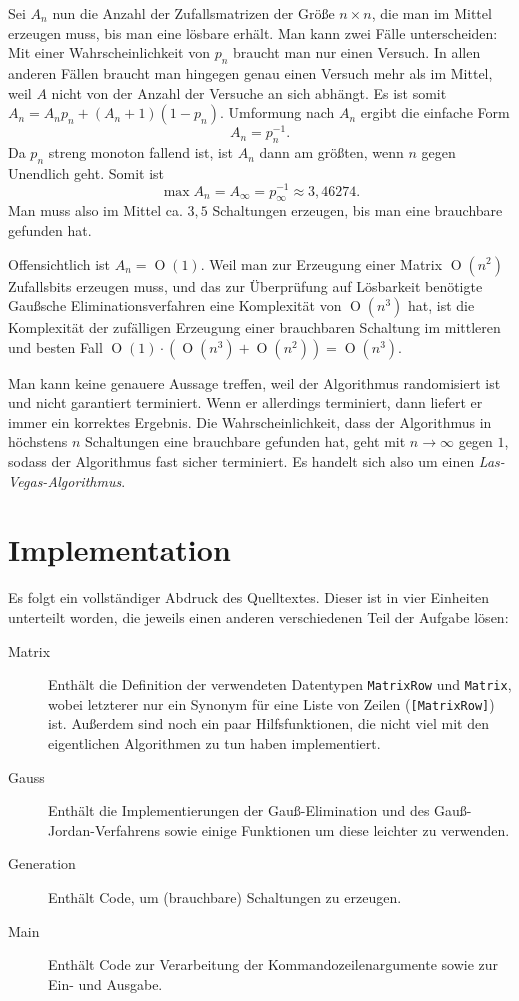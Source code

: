 \documentclass{scrartcl}
\DeclareMathOperator{\bigO}{O}
\begin{document}
Sei $A_n$ nun die Anzahl der Zufallsmatrizen der Größe $n\times n$, die man im
Mittel erzeugen muss, bis man eine lösbare erhält. Man kann zwei Fälle
unterscheiden: Mit einer Wahrscheinlichkeit von $p_n$ braucht man nur einen
Versuch. In allen anderen Fällen braucht man hingegen genau einen Versuch mehr
als im Mittel, weil $A$ nicht von der Anzahl der Versuche an sich abhängt. Es
ist somit $A_n=A_np_n+(A_n+1)(1-p_n)$. Umformung nach $A_n$ ergibt die
einfache Form
\begin{equation}
A_n=p_n^{-1}.
\end{equation}
Da $p_n$ streng monoton fallend ist, ist $A_n$ dann am größten, wenn $n$ gegen
Unendlich geht. Somit ist
\begin{equation}
\max A_n = A_\infty = p_\infty^{-1} \approx 3{,}46274.
\end{equation}
Man muss also im Mittel ca. $3{,}5$ Schaltungen erzeugen, bis man eine
brauchbare gefunden hat.

Offensichtlich ist $A_n=\bigO(1)$. Weil man zur Erzeugung einer Matrix $\bigO(n^
2)$ Zufallsbits erzeugen muss, und das zur Überprüfung auf Lösbarkeit benötigte
Gaußsche Eliminationsverfahren eine Komplexität von $\bigO(n^3)$ hat, ist die
Komplexität der zufälligen Erzeugung einer brauchbaren Schaltung im mittleren
und besten Fall $\bigO(1)\cdot\left(\bigO(n^3)+\bigO(n^2)\right)=\bigO(n^3)$.

Man kann keine genauere Aussage treffen, weil der Algorithmus randomisiert ist
und nicht garantiert terminiert. Wenn er allerdings terminiert, dann liefert er
immer ein korrektes Ergebnis. Die Wahrscheinlichkeit, dass der Algorithmus in
höchstens $n$ Schaltungen eine brauchbare gefunden hat, geht mit $n\to\infty$
gegen $1$, sodass der Algorithmus fast sicher terminiert. Es handelt sich also
um einen \emph{Las-Vegas-Algorithmus}.

\section{Implementation}\label{implementation}
Es folgt ein vollständiger Abdruck des Quelltextes. Dieser ist in vier Einheiten
unterteilt worden, die jeweils einen anderen verschiedenen Teil der Aufgabe
lösen:

\begin{description}
\item[Matrix] Enthält die Definition der verwendeten Datentypen \texttt
  {MatrixRow} und \texttt{Matrix}, wobei letzterer nur ein Synonym für eine
  Liste von Zeilen (\texttt{[MatrixRow]}) ist. Außerdem sind noch ein paar
  Hilfsfunktionen, die nicht viel mit den eigentlichen Algorithmen zu tun haben
  implementiert.
\item[Gauss] Enthält die Implementierungen der Gauß-Elimination und des
  Gauß-Jordan-Verfahrens sowie einige Funktionen um diese leichter zu verwenden.
\item[Generation] Enthält Code, um (brauchbare) Schaltungen zu erzeugen.
\item[Main] Enthält Code zur Verarbeitung der Kommandozeilenargumente sowie zur
  Ein- und Ausgabe.
\end{description}
\end{document}
